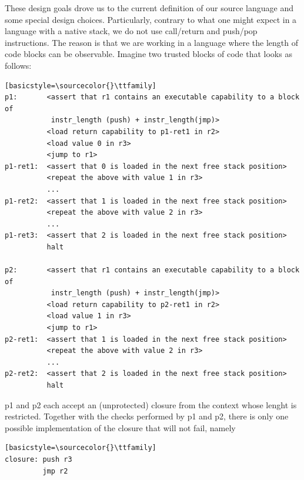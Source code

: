\documentclass[a4paper]{article}
\newcommand{\sourcecolor}[1]{\color{blue}}
\begin{document}
These design goals drove us to the current definition of our source language and some special design choices.
Particularly, contrary to what one might expect in a language with a native stack, we do not use call/return and push/pop instructions.
The reason is that we are working in a language where the length of code blocks can be observable.
Imagine two trusted blocks of code that looks as follows:
\begin{lstlisting}
[basicstyle=\sourcecolor{}\ttfamily] 
p1:       <assert that r1 contains an executable capability to a block of 
           instr_length (push) + instr_length(jmp)>
          <load return capability to p1-ret1 in r2>
          <load value 0 in r3>
          <jump to r1>
p1-ret1:  <assert that 0 is loaded in the next free stack position>
          <repeat the above with value 1 in r3>
          ...
p1-ret2:  <assert that 1 is loaded in the next free stack position>
          <repeat the above with value 2 in r3>
          ...
p1-ret3:  <assert that 2 is loaded in the next free stack position>
          halt

p2:       <assert that r1 contains an executable capability to a block of 
           instr_length (push) + instr_length(jmp)>
          <load return capability to p2-ret1 in r2>
          <load value 1 in r3>
          <jump to r1>
p2-ret1:  <assert that 1 is loaded in the next free stack position>
          <repeat the above with value 2 in r3>
          ...
p2-ret2:  <assert that 2 is loaded in the next free stack position>
          halt
\end{lstlisting}

p1 and p2 each accept an (unprotected) closure from the context whose lenght is restricted.
Together with the checks performed by p1 and p2, there is only one possible implementation of the closure that will not fail, namely
\begin{lstlisting}
[basicstyle=\sourcecolor{}\ttfamily] 
closure: push r3
         jmp r2
\end{lstlisting}
\end{document}

